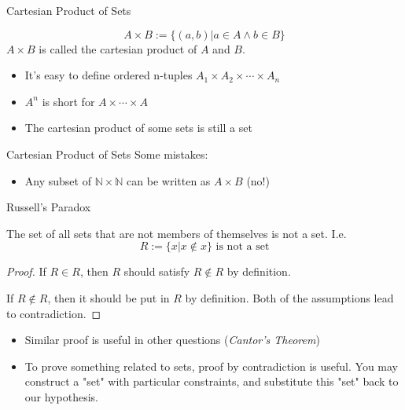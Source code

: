 \begin{frame}{Cartesian Product of Sets}
    \begin{definition}
        $$A\times B:=\{(a,b)|a\in A\wedge b\in B\}$$
        $A\times B$ is called the cartesian product of $A$ and $B$.
    \end{definition}
    \begin{itemize}
        \item It's easy to define ordered n-tuples $A_1\times A_2\times\cdots\times A_n$
        \item $A^n$ is short for $A\times\cdots\times A$
        \item The cartesian product of some sets is still a set
    \end{itemize}
\end{frame}

\begin{frame}{Cartesian Product of Sets}
    Some mistakes:
    \begin{itemize}
        \item Any subset of $\mathbb{N}\times \mathbb{N}$ can be written as $A\times B$ (no!)
    \end{itemize}
\end{frame}

\begin{frame}{Russell's Paradox}
    \begin{theorem}
        The set of all sets that are not members of themselves is not a set. I.e. $$R:=\{x|x\notin x\} \text{ is not a set}$$
    \end{theorem}
    \begin{proof}
        If $R\in R$, then $R$ should satisfy $R\notin R$ by definition. 
        
        If $R\notin R$, then it should be put in $R$ by definition.
        Both of the assumptions lead to contradiction.
    \end{proof}
    \begin{itemize}
        \item Similar proof is useful in other questions (\emph{Cantor's Theorem})
        \item To prove something related to sets, proof by contradiction is useful. You may construct a "set" with particular constraints, and substitute this "set" back to our hypothesis.
    \end{itemize}
\end{frame}